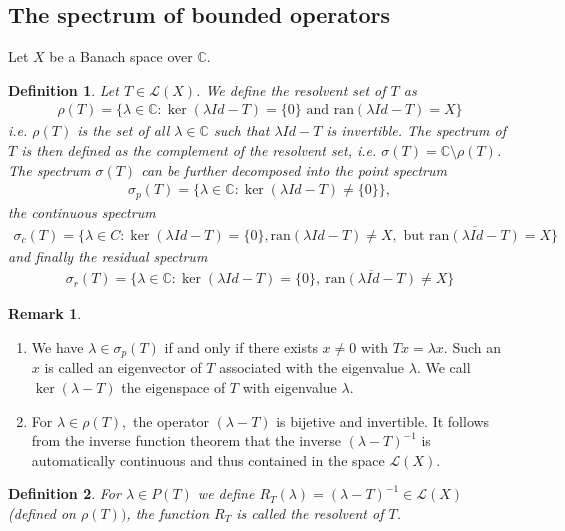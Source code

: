 \documentclass[11pt,a4paper]{article}
\newtheorem{defn}{Definition}[section]
\theoremstyle{definition}
\newtheorem{rem}{Remark}[section]
\begin{document}
\subsection{The spectrum of bounded operators}
Let $X$ be a Banach space over $\mathbb{C}$. 
\begin{defn} Let $T \in \mathcal{L}(X)$. We define the resolvent set of $T$ as 
\begin{align*}
\rho(T)= \lbrace \lambda \in \mathbb{C}: \ker( \lambda Id-T)= \lbrace 0 \rbrace \text{ and } \text{ran}( \lambda Id-T)=X \rbrace 
\end{align*}
i.e. $\rho(T)$ is the set of all $\lambda \in \mathbb{C}$ such that $ \lambda Id-T$ is invertible. The spectrum of $T$ is then defined as the complement of the resolvent set, i.e. $\sigma(T)= \mathbb{C} \setminus \rho(T)$. The spectrum $\sigma(T)$ can be further decomposed into the point spectrum 
\begin{align*}
\sigma_p(T)= \lbrace \lambda \in \mathbb{C}:  \ker( \lambda Id-T) \neq \lbrace 0 \rbrace \rbrace,
\end{align*}
the continuous spectrum 
\begin{align*}
\sigma_c(T)= \lbrace \lambda \in C : \ker( \lambda Id-T)= \lbrace 0 \rbrace, \text{ran}( \lambda Id-T) \neq X, \text{ but } \overline{\text{ran}(\lambda Id-T)}= X \rbrace 
\end{align*}
and finally the residual spectrum
\begin{align*}
\sigma_r(T)= \lbrace \lambda \in \mathbb{C}: \ker( \lambda Id-T)= \lbrace 0 \rbrace,\ \overline{\text{ran}(\lambda Id-T)} \neq X \rbrace 
\end{align*}
\end{defn}
\begin{rem} \ 
\begin{enumerate}
\item We have $\lambda \in \sigma_p(T)$ if and only if there exists $x \neq 0$ with $Tx= \lambda x$. Such an $x$ is called an eigenvector of $T$ associated with the eigenvalue $\lambda$. We call $\ker( \lambda-T)$ the eigenspace of $T$ with eigenvalue $\lambda$. 
\item For $\lambda \in \rho(T),$ the operator $( \lambda-T)$ is bijetive and invertible. It follows from the inverse function theorem that the inverse $( \lambda-T)^{-1}$ is automatically continuous and thus contained in the space $\mathcal{L}(X)$. 
\end{enumerate}
\end{rem}
\begin{defn} For $ \lambda \in P(T)$ we define $R_T( \lambda) = ( \lambda-T)^{-1} \in \mathcal{L}(X)$ (defined on $\rho(T))$, the function $R_T$ is called the resolvent of $T$. 
\end{defn}
\end{document}
